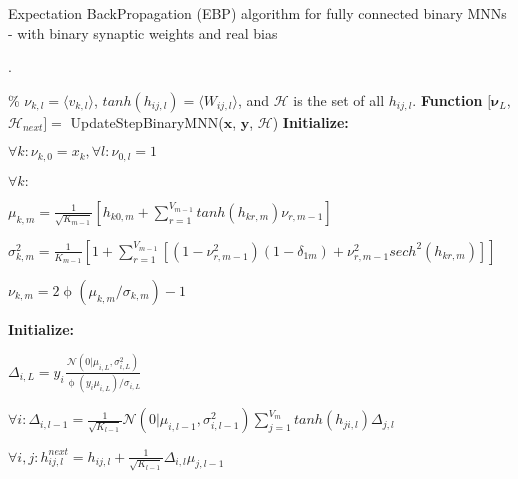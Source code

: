\documentclass{article} %
\begin{document}
\begin{algorithm}
\caption{Expectation BackPropagation (EBP) algorithm for fully connected binary MNNs - with binary synaptic weights and real bias~\citep{Soudry14}}.
\label{algorithm1}
\begin{algorithmic}
\State \% $\nu_{k,l}=\langle v_{k,l} \rangle$, $tanh(h_{ij,l}) = \langle W_{ij,l} \rangle$, and $\mathcal{H}$ is the set of all $h_{ij,l}$.
\State \textbf{Function} $[\bm{\nu}_L$, $\bm{\mathcal{H}}_{next}] = $ UpdateStepBinaryMNN($\textbf{x}$, $\textbf{y}$, $\bm{\mathcal{H}}$) \newline
{}
\State \textbf{Initialize:}
    \begin{center}
        $\forall{k}: \nu_{k,0}=x_k, \forall{l}: \nu_{0,l}=1$
    \end{center}
 \newline
    $\forall{k}:$

            $\mu_{k,m} = \frac{1}{\sqrt{K_{m-1}}}[h_{k0,m} + \sum^{V_{m-1}}_{r=1}tanh(h_{kr,m})\nu_{r,m-1}]$

            $\sigma^2_{k,m} = \frac{1}{K_{m-1}}[1+\sum^{V_{m-1}}_{r=1}[(1-\nu^2_{r,m-1})(1-\delta_{1m}) + \nu^2_{r,m-1}sech^2(h_{kr,m})]]$

            $\nu_{k,m}=2\upphi(\mu_{k,m}/\sigma_{k,m})-1$ \newline

\EndFor \newline
{}
\State \textbf{Initialize:}
    \begin{center}
        $\Delta_{i,L}=y_i\frac{\mathcal{N}(0|\mu_{i,L},\sigma^2_{i,L})}{\upphi(y_i\mu_{i,L})/\sigma_{i,L}}$
    \end{center}
 \newline

        $\forall{i}: \Delta_{i, l-1} = \frac{1}{\sqrt{K_{l-1}}}\mathcal{N}(0|\mu_{i,l-1},\sigma^2_{i,l-1})\sum^{V_{m}}_{j=1}tanh(h_{ji,l})\Delta_{j,l}$

        $\forall{i,j}: h^{next}_{ij,l}=h_{ij,l}+ \frac{1}{\sqrt{K_{l-1}}}\Delta_{i,l}\mu_{j,l-1}$ \newline

\EndFor

\end{algorithmic}
\end{algorithm}
\end{document}

